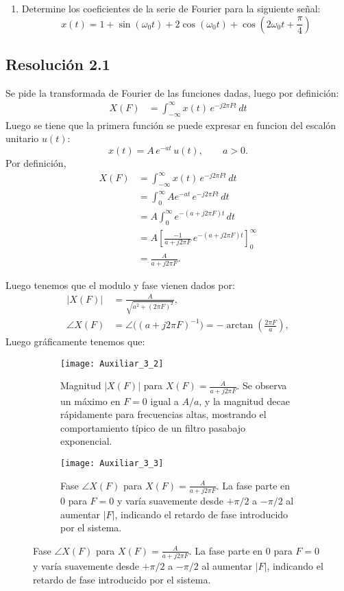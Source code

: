 \documentclass[
  11pt,
  letterpaper,
   addpoints,
   answers
  ]{exam}
\begin{document}
\begin{questions}
\begin{enumerate}
\item Determine los coeficientes de la serie de Fourier para la siguiente señal:
\begin{equation}
  x(t) = 1 + \sin(\omega_0 t) + 2\cos(\omega_0 t) + \cos\left(2\omega_0 t + \frac{\pi}{4}\right)
\end{equation}
\end{enumerate}
\begin{solution}
\subsection*{Resolución 2.1}
Se pide la transformada de Fourier de las funciones dadas, luego por definición:
\begin{align}
  X(F) &= \int_{-\infty}^{\infty} x(t)\,e^{-j2\pi F t}\,dt
\end{align}
Luego se tiene que la primera función se puede expresar en funcion del escalón unitario \(u(t)\):
\[
x(t)=A\,e^{-a t}\,u(t),\qquad a>0.
\]
Por definición,
\begin{align}
X(F)
  &= \int_{-\infty}^{\infty} x(t)\,e^{-j2\pi F t}\,dt \\
  &= \int_{0}^{\infty} A e^{-a t}\,e^{-j2\pi F t}\,dt \\
  &= A\int_{0}^{\infty} e^{-(a+j2\pi F)t}\,dt \\
  &= A\left[\frac{-1}{a+j2\pi F}\,e^{-(a+j2\pi F)t}\right]_{0}^{\infty} \\
  &= \frac{A}{a+j2\pi F}.
\end{align}

Luego tenemos que el modulo y fase vienen dados por:
\begin{align}
|X(F)|
  &= \frac{A}{\sqrt{a^{2}+(2\pi F)^{2}}},\\
\angle X(F)
  &= \angle\big((a+j2\pi F)^{-1}\big)
   = -\arctan\!\left(\frac{2\pi F}{a}\right),
\end{align}
Luego gráficamente tenemos que: 

\begin{figure}[H]
  \centering

  \begin{subfigure}[t]{0.48\textwidth}
    \centering
    \texttt{[image: Auxiliar\_3\_2]} %
    \caption{Magnitud $|X(F)|$ para $X(F)=\frac{A}{a+j2\pi F}$. Se observa un máximo en $F=0$ igual a $A/a$, y la magnitud decae rápidamente para frecuencias altas, mostrando el comportamiento típico de un filtro pasabajo exponencial.}
    \label{fig:mag_XF}
  \end{subfigure}
  \hfill
  \begin{subfigure}[t]{0.48\textwidth}
    \centering
    \texttt{[image: Auxiliar\_3\_3]}
    \caption{Fase $\angle X(F)$ para $X(F)=\frac{A}{a+j2\pi F}$. La fase parte en $0$ para $F=0$ y varía suavemente desde $+\pi/2$ a $-\pi/2$ al aumentar $|F|$, indicando el retardo de fase introducido por el sistema.}
    \label{fig:fase_XF}
  \end{subfigure}


\end{figure}
\end{solution}
\end{questions}
\end{document}
